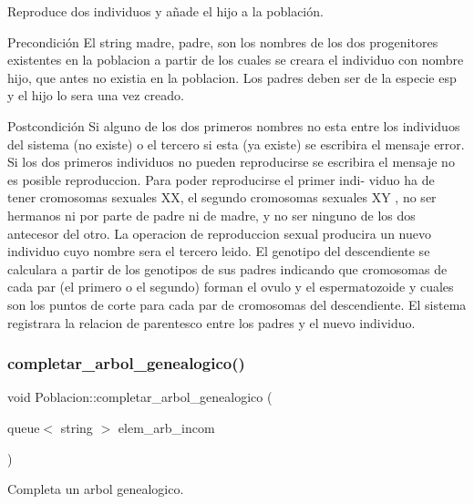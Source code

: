 Reproduce dos individuos y añade el hijo a la población. 

\begin{DoxyPrecond}{Precondición}
El string madre, padre, son los nombres de los dos progenitores existentes en la poblacion a partir de los cuales se creara el individuo con nombre hijo, que antes no existia en la poblacion. Los padres deben ser de la especie esp y el hijo lo sera una vez creado.
\end{DoxyPrecond}
\begin{DoxyPostcond}{Postcondición}
Si alguno de los dos primeros nombres no esta entre los individuos del sistema (no existe) o el tercero si esta (ya existe) se escribira el mensaje error. Si los dos primeros individuos no pueden reproducirse se escribira el mensaje no es posible reproduccion. Para poder reproducirse el primer indi-\/ viduo ha de tener cromosomas sexuales XX, el segundo cromosomas sexuales XY , no ser hermanos ni por parte de padre ni de madre, y no ser ninguno de los dos antecesor del otro. La operacion de reproduccion sexual producira un nuevo individuo cuyo nombre sera el tercero leido. El genotipo del descendiente se calculara a partir de los genotipos de sus padres indicando que cromosomas de cada par (el primero o el segundo) forman el ovulo y el espermatozoide y cuales son los puntos de corte para cada par de cromosomas del descendiente. El sistema registrara la relacion de parentesco entre los padres y el nuevo individuo. 
\end{DoxyPostcond}
\mbox{\label{class_poblacion_a2dd7bd82d100852ad3767d5830fe932a}} 
\subsubsection{\texorpdfstring{completar\+\_\+arbol\+\_\+genealogico()}{completar\_arbol\_genealogico()}}
{\footnotesize\ttfamily void Poblacion\+::completar\+\_\+arbol\+\_\+genealogico (\begin{DoxyParamCaption}\item[{queue$<$ string $>$}]{elem\+\_\+arb\+\_\+incom }\end{DoxyParamCaption})}



Completa un arbol genealogico. 

